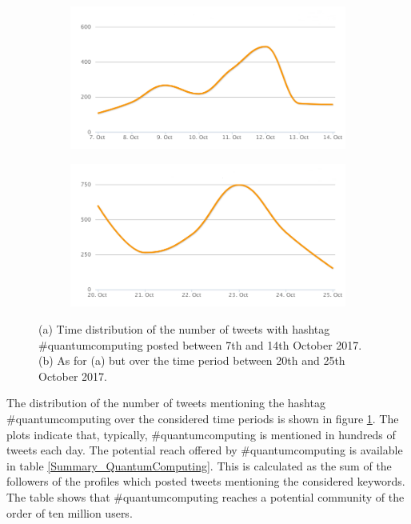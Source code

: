 \begin{figure}
 \centering
 \begin{subfigure}[t]{0.9\textwidth}
   \includegraphics[width=1\linewidth]{Images/FirstSearch_QuantumComputing.png}
   \caption{} 
 \end{subfigure}

 \begin{subfigure}[t]{0.9\textwidth}
   \includegraphics[width=1\linewidth]{Images/SecondSearch_QuantumComputing.png}
   \caption{}
 \end{subfigure}
 \caption{(a) Time distribution of the number of tweets with hashtag \#quantumcomputing posted between 7th and 14th October 2017. (b) As for (a) but over the time period between 20th and 25th October 2017.} 
 \label{First-SecondSearch_QuantumComputing}
\end{figure}

The distribution of the number of tweets mentioning the hashtag \#quantumcomputing over the considered time periods is shown in figure \ref{First-SecondSearch_QuantumComputing}. The plots indicate that, typically, \#quantumcomputing is mentioned in hundreds of tweets each day. The potential reach offered by \#quantumcomputing is available in table \ref{Summary_QuantumComputing}. This is calculated as the sum of the followers of the profiles which posted tweets mentioning the considered keywords. The table shows that \#quantumcomputing reaches a potential community of the order of ten million users.

